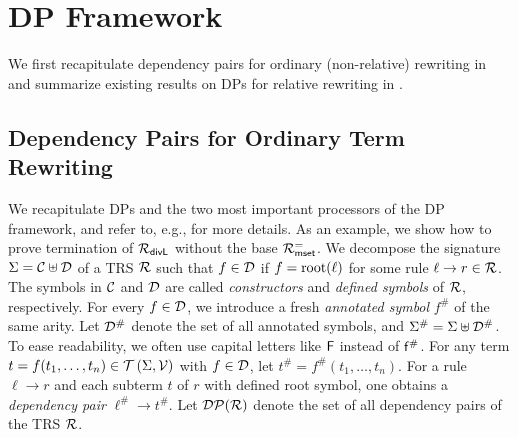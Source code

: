 \section{DP Framework}\label{DP Framework}

We first recapitulate dependency pairs for ordinary (non-relative) rewriting in 
and summarize existing results on DPs for relative rewriting in .

\subsection{Dependency Pairs for Ordinary Term Rewriting}\label{Dependency Pairs for Ordinary Term Rewriting}

We recapitulate DPs and the two most important processors of the DP framework, and refer to, e.g.,
\cite{arts2000termination,gieslLPAR04dpframework,giesl2006mechanizing,hirokawa2005automating,DBLP:journals/iandc/HirokawaM07}
for more details.
As an example, we show how to prove termination of $\mathcal{R}_{\mathsf{divL}}$ without the base $\mathcal{R}^{=}_{\mathsf{mset}}$.
We decompose the signature
$\Sigma =  \mathcal{C} \uplus  \mathcal{D}$ of a TRS $\mathcal{R}$ 
such that $f \in \mathcal{D}$ if $f = \operatorname{root}(\ell)$ for some rule $\ell \to r \in \mathcal{R}$.
The symbols in $\mathcal{C}$ and $\mathcal{D}$ are called 
\emph{constructors} and \emph{defined symbols} of $\mathcal{R}$, respectively. 
For every $f \in \mathcal{D}$, we introduce a fresh \emph{annotated symbol} $f^{\#}$ of the same arity.
Let $\mathcal{D}^\#$ denote the set of all annotated symbols, and $\Sigma^\# = \Sigma \uplus \mathcal{D}^\#$.
To ease readability, we often use capital letters like $\mathsf{F}$ instead of $\mathsf{f}^\#$.
For any term $t = f(t_1,\ldots,t_n) \in \mathcal{T}\left(\Sigma,\mathcal{V}\right)$ with $f \in \mathcal{D}$, 
let $t^{\#} = f^{\#}(t_1,\ldots,t_n)$.
For a rule $\ell \to r$ and each subterm $t$ of $r$ with \pagebreak[2] defined root symbol, one obtains a
\emph{dependency pair} $\ell^\# \to t^\#$.
Let $\mathcal{DP}(\mathcal{R})$ denote the set of all dependency pairs of the TRS $\mathcal{R}$.

